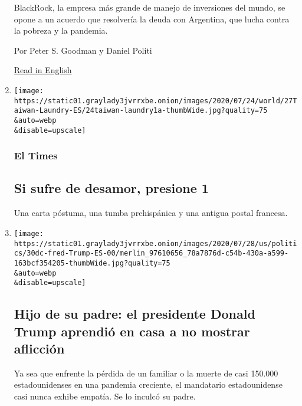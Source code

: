 \begin{enumerate}
  BlackRock, la empresa más grande de manejo de inversiones del mundo,
  se opone a un acuerdo que resolvería la deuda con Argentina, que lucha
  contra la pobreza y la pandemia.

  Por Peter S. Goodman y Daniel Politi

  \href{https://www.nytimes3xbfgragh.onion/2020/07/31/business/argentina-debt.html}{Read
  in English}
\item
  \href{/es/2020/07/31/espanol/elecciones-2020-trump-mexico-violencia.html}{}

  \texttt{[image: https://static01.graylady3jvrrxbe.onion/images/2020/07/24/world/27Taiwan-Laundry-ES/24taiwan-laundry1a-thumbWide.jpg?quality=75\\\&auto=webp\\\&disable=upscale]}

  \hypertarget{el-times}{%
  \subsubsection{El Times}\label{el-times}}

  \hypertarget{si-sufre-de-desamor-presione-1}{%
  \subsection{Si sufre de desamor, presione
  1}\label{si-sufre-de-desamor-presione-1}}

  Una carta póstuma, una tumba prehispánica y una antigua postal
  francesa.
\item
  \href{/es/2020/07/31/espanol/estados-unidos/fred-trump-donald-trump.html}{}

  \texttt{[image: https://static01.graylady3jvrrxbe.onion/images/2020/07/28/us/politics/30dc-fred-Trump-ES-00/merlin\_97610656\_78a7876d-c54b-430a-a599-163bcf354205-thumbWide.jpg?quality=75\\\&auto=webp\\\&disable=upscale]}

  \hypertarget{hijo-de-su-padre-el-presidente-donald-trump-aprendiuxf3-en-casa-a-no-mostrar-aflicciuxf3n}{%
  \subsection{Hijo de su padre: el presidente Donald Trump aprendió en
  casa a no mostrar
  aflicción}\label{hijo-de-su-padre-el-presidente-donald-trump-aprendiuxf3-en-casa-a-no-mostrar-aflicciuxf3n}}

  Ya sea que enfrente la pérdida de un familiar o la muerte de casi
  150.000 estadounidenses en una pandemia creciente, el mandatario
  estadounidense casi nunca exhibe empatía. Se lo inculcó su padre.


\end{enumerate}
